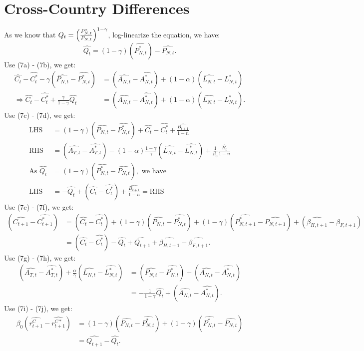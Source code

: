 \documentclass[a4paper,12pt]{article} %
\theoremstyle{nonitalic}
\begin{document}
\section{Cross-Country Differences}
As we know that $Q_t = \Bigl(\frac{P_{N,t}^*}{P_{N,t}}\Bigr)^{1-\gamma}$, log-linearize the equation, we have:
\[\widehat{Q_t} = (1-\gamma)(\widehat{P_{N,t}^*}) - \widehat{P_{N,t}}.\]
Use (7a) - (7b), we get:
\begin{align*}
    \widehat{C_t} - \widehat{C_t^*} - \gamma(\widehat{P_{N,t}} - \widehat{P_{N,t}^*}) &= (\widehat{A_{N,t}} - \widehat{A_{N,t}^*}) + (1-\alpha)(\widehat{L_{N,t}} - \widehat{L_{N,t}^*}) \\
    \Rightarrow \widehat{C_t} - \widehat{C_t^*} + \frac{\gamma}{1-\gamma}\widehat{Q_t} &= (\widehat{A_{N,t}} - \widehat{A_{N,t}^*}) + (1-\alpha)(\widehat{L_{N,t}} - \widehat{L_{N,t}^*}) \tag{9a}.
\end{align*}
Use (7c) - (7d), we get:
\begin{align*}
    \text{LHS} &= (1-\gamma)(\widehat{P_{N,t}} - \widehat{P_{N,t}^*}) + \widehat{C_t} - \widehat{C_t^*} + \frac{\widehat{B_{t+1}}}{1-n} \\
    \text{RHS} &= (\widehat{A_{T,t}} - \widehat{A_{T,t}^*}) - (1-\alpha)\frac{1-\gamma}{\gamma}(\widehat{L_{N,t}} - \widehat{L_{N,t}^*}) + \frac{1}{\beta_0} \frac{\widehat{B_t}}{1-n} \\
    \text{As } \widehat{Q_t} &= (1-\gamma)(\widehat{P_{N,t}^*} - \widehat{P_{N,t}}), \text{ we have} \\ 
    \text{LHS} &= - \widehat{Q_t} + (\widehat{C_t} - \widehat{C_t^*}) + \frac{\widehat{B_{t+1}}}{1-n} = \text{RHS} \tag{9b}
\end{align*}
Use (7e) - (7f), we get:
\begin{align*}
    (\widehat{C_{t+1}} - \widehat{C_{t+1}^*}) &= (\widehat{C_t} - \widehat{C_t^*}) + (1-\gamma)(\widehat{P_{N,t}} - \widehat{P_{N,t}^*}) + (1-\gamma)(\widehat{P_{N,t+1}^*} - \widehat{P_{N,t+1}}) + (\widehat{\beta_{H, t+1}} - \widehat{\beta_{F, t+1}}) \\
    &= (\widehat{C_t} - \widehat{C_t^*}) - \widehat{Q_t} + \widehat{Q_{t+1}} + \widehat{\beta_{H, t+1}} - \widehat{\beta_{F, t+1}} \tag{9c}.
\end{align*}
Use (7g) - (7h), we get:
\begin{align*}
    (\widehat{A_{T,t}} - \widehat{A_{T,t}^*}) + \frac{\alpha}{\gamma}(\widehat{L_{N,t}} - \widehat{L_{N,t}^*}) &= (\widehat{P_{N,t}} - \widehat{P_{N,t}^*}) + (\widehat{A_{N,t}} - \widehat{A_{N,t}^*}) \\
    &= - \frac{1}{1-\gamma} \widehat{Q_t} + (\widehat{A_{N,t}} - \widehat{A_{N,t}^*}) \tag{9d}.
\end{align*}
Use (7i) - (7j), we get:
\begin{align*}
    \beta_0(\widehat{r_{t+1}^C} - \widehat{r_{t+1}^{C*}}) &= (1-\gamma)(\widehat{P_{N,t}} - \widehat{P_{N,t}^*}) + (1-\gamma)(\widehat{P_{N,t}^*} - \widehat{P_{N,t}}) \\
    &= \widehat{Q_{t+1}} - \widehat{Q_t} \tag{9e}.
\end{align*}
\end{document}
